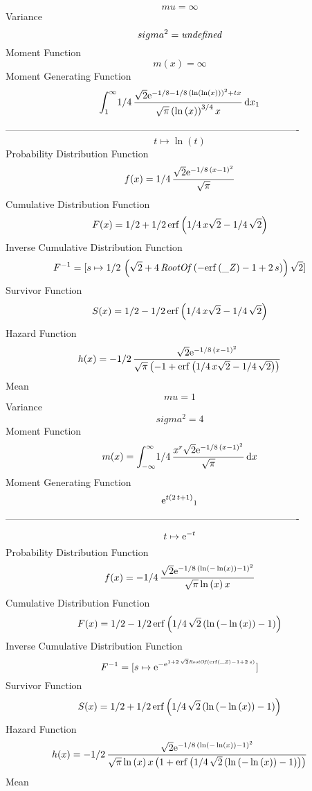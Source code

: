 \documentclass[12pt]{article}
\begin{document}
 $$ mu=\infty 
$$ Variance 
 $$ sigma^2 = {\it undefined}
$$Moment Function 
 $$ m(x) = \infty 
$$ Moment Generating Function 
 $$\int_{1}^{\infty }\!1/4\,{\frac {\sqrt {2}{{\rm e}^{-1/8-1/8\, \left( 
\ln  \left( \ln  \left( x \right)  \right)  \right) ^{2}+tx}}}{\sqrt {
\pi} \left( \ln  \left( x \right)  \right) ^{3/4}x}}\,{\rm d}x_{{1}}
$$-------------------------------------------------------------------------------------------  \\$$t\mapsto \ln  \left( t \right) 
$$Probability Distribution Function 
$$  f(x)=1/4\,{\frac {\sqrt {2}{{\rm e}^{-1/8\, \left( x-1 \right) ^{2}}}}{
\sqrt {\pi}}}
$$Cumulative Distribution Function  
 $$F(x)=1/2+1/2\,{\rm erf} \left(1/4\,x\sqrt {2}-1/4\,\sqrt {2}\right)
$$ Inverse Cumulative Distribution Function 
  $$F^{-1} = [s\mapsto 1/2\, \left( \sqrt {2}+4\,{\it RootOf} \left( -{\rm erf} 
\left({\it \_Z}\right)-1+2\,s \right)  \right) \sqrt {2}]
$$Survivor Function 
 $$ S(x)=1/2-1/2\,{\rm erf} \left(1/4\,x\sqrt {2}-1/4\,\sqrt {2}\right)
$$ Hazard Function 
 $$ h(x)=-1/2\,{\frac {\sqrt {2}{{\rm e}^{-1/8\, \left( x-1 \right) ^{2}}}}{
\sqrt {\pi} \left( -1+{\rm erf} \left(1/4\,x\sqrt {2}-1/4\,\sqrt {2}
\right) \right) }}
$$Mean 
 $$ mu=1
$$ Variance 
 $$ sigma^2 = 4
$$Moment Function 
 $$ m(x) = \int_{-\infty }^{\infty }\!1/4\,{\frac {{x}^{r}\sqrt {2}{{\rm e}^{-1/8
\, \left( x-1 \right) ^{2}}}}{\sqrt {\pi}}}\,{\rm d}x
$$ Moment Generating Function 
 $${{\rm e}^{t \left( 2\,t+1 \right) }}_{{1}}
$$-------------------------------------------------------------------------------------------  \\$$t\mapsto {{\rm e}^{-t}}
$$Probability Distribution Function 
$$  f(x)=-1/4\,{\frac {\sqrt {2}{{\rm e}^{-1/8\, \left( \ln  \left( -\ln 
 \left( x \right)  \right) -1 \right) ^{2}}}}{\sqrt {\pi}\ln  \left( x
 \right) x}}
$$Cumulative Distribution Function  
 $$F(x)=1/2-1/2\,{\rm erf} \left(1/4\,\sqrt {2} \left( \ln  \left( -\ln 
 \left( x \right)  \right) -1 \right) \right)
$$ Inverse Cumulative Distribution Function 
  $$F^{-1} = [s\mapsto {{\rm e}^{-{{\rm e}^{1+2\,\sqrt {2}{\it RootOf} \left( 
{\rm erf} \left({\it \_Z}\right)-1+2\,s \right) }}}}]
$$Survivor Function 
 $$ S(x)=1/2+1/2\,{\rm erf} \left(1/4\,\sqrt {2} \left( \ln  \left( -\ln 
 \left( x \right)  \right) -1 \right) \right)
$$ Hazard Function 
 $$ h(x)=-1/2\,{\frac {\sqrt {2}{{\rm e}^{-1/8\, \left( \ln  \left( -\ln 
 \left( x \right)  \right) -1 \right) ^{2}}}}{\sqrt {\pi}\ln  \left( x
 \right) x \left( 1+{\rm erf} \left(1/4\,\sqrt {2} \left( \ln  \left( 
-\ln  \left( x \right)  \right) -1 \right) \right) \right) }}
$$Mean 
\end{document}
